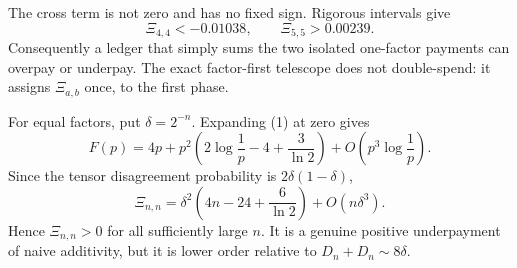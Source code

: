 The cross term is not zero and has no fixed sign.  Rigorous intervals give
\[
 \Xi_{4,4}<-0.01038,
 \qquad
 \Xi_{5,5}>0.00239.                                          \tag{7}
\]
Consequently a ledger that simply sums the two isolated one-factor
payments can overpay or underpay.  The exact factor-first telescope does
not double-spend: it assigns $\Xi_{a,b}$ once, to the first phase.

For equal factors, put $\delta=2^{-n}$.  Expanding (1) at zero gives
\[
 F(p)=4p+p^2\left(2\log\frac1p-4+\frac3{\ln2}\right)
 +O\!\left(p^3\log\frac1p\right).
\]
Since the tensor disagreement probability is $2\delta(1-\delta)$,
\[
 \boxed{\Xi_{n,n}=\delta^2\left(4n-24+\frac6{\ln2}\right)
 +O(n\delta^3).}                                              \tag{8}
\]
Hence $\Xi_{n,n}>0$ for all sufficiently large $n$.  It is a genuine
positive underpayment of naive additivity, but it is lower order relative
to $D_n+D_n\sim8\delta$.

